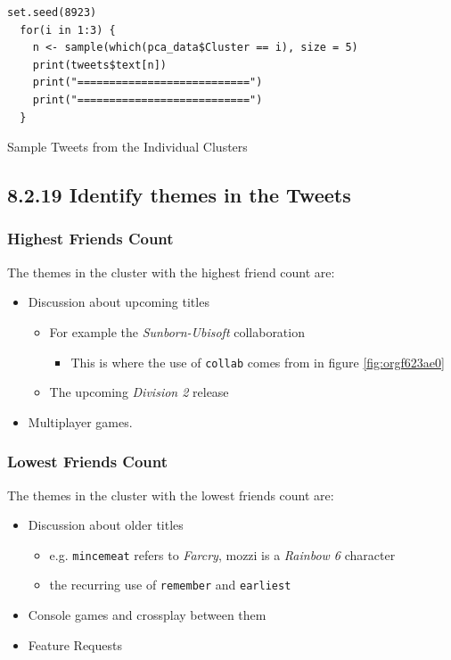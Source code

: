\documentclass[11pt]{article}
\begin{document}
\begin{listing}[htbp]
\begin{verbatim}
set.seed(8923)
  for(i in 1:3) {
    n <- sample(which(pca_data$Cluster == i), size = 5)
    print(tweets$text[n])
    print("===========================")
    print("===========================")
  }
\end{verbatim}
\caption{\label{orgc9eafda}Sample Tweets from the Individual Clusters}
\end{listing}

\subsection{8.2.19 Identify themes in the Tweets}
\label{sec:orgf5fdbca}
\subsubsection{Highest Friends Count}
\label{sec:org23bf67a}
The themes in the cluster with the highest friend count are:

\begin{itemize}
\item Discussion about upcoming titles
\begin{itemize}
\item For example the \emph{Sunborn-Ubisoft} collaboration
\begin{itemize}
\item This is where the use of \texttt{collab} comes from in figure \ref{fig:orgf623ae0}
\end{itemize}
\item The upcoming \emph{Division 2} release
\end{itemize}
\item Multiplayer games.
\end{itemize}
\subsubsection{Lowest Friends Count}
\label{sec:org10c65a2}

The themes in the cluster with the lowest friends count are:

\begin{itemize}
\item Discussion about older titles
\begin{itemize}
\item e.g. \texttt{mincemeat} refers to \emph{Farcry}, mozzi is a \emph{Rainbow 6} character
\item the recurring use of \texttt{remember} and \texttt{earliest}
\end{itemize}
\item Console games and crossplay between them
\item Feature Requests
\end{itemize}
\end{document}
